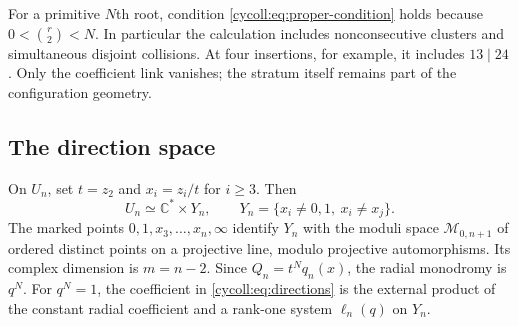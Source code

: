For a primitive $N$th root, condition
\eqref{cycoll:eq:proper-condition} holds because
$0<\binom r2<N$. In particular the calculation includes
nonconsecutive clusters and simultaneous disjoint collisions.
At four insertions, for example, it includes $13\mid24$.
Only the coefficient link vanishes; the stratum itself
remains part of the configuration geometry.

\subsection{The direction space}

On $U_n$, set $t=z_2$ and $x_i=z_i/t$ for $i\geq3$.
Then
\begin{equation}\label{cycoll:eq:directions}
 U_n\simeq\mathbb C^*\times Y_n,\qquad
 Y_n=\{x_i\ne0,1,\ x_i\ne x_j\}.
\end{equation}
The marked points $0,1,x_3,\ldots,x_n,\infty$ identify
$Y_n$ with the moduli space $\mathcal M_{0,n+1}$ of ordered
distinct points on a projective line, modulo projective
automorphisms. Its complex dimension is $m=n-2$.
Since $Q_n=t^Nq_n(x)$, the radial monodromy is $q^N$.
For $q^N=1$, the coefficient in
\eqref{cycoll:eq:directions} is the external product of
the constant radial coefficient and a rank-one system
$\ell_n(q)$ on $Y_n$.


